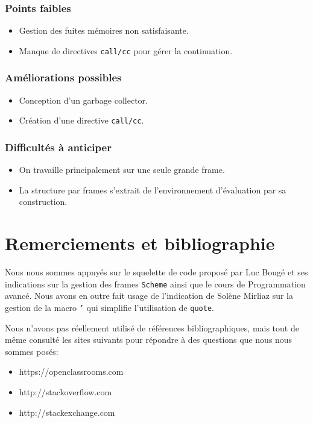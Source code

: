 \documentclass[a4paper,11pt]{article}
\begin{document}
\subsubsection*{Points faibles}
\begin{itemize}
\item Gestion des fuites mémoires non satisfaisante.
\item Manque de directives \texttt{call/cc} pour gérer la continuation.
\end{itemize}

\subsubsection*{Améliorations possibles}
\begin{itemize}
\item Conception d'un garbage collector.
\item Création d'une directive \texttt{call/cc}.
\end{itemize}

\subsubsection*{Difficultés à anticiper}
\begin{itemize}
\item On travaille principalement sur une seule grande frame.
\item La structure par frames s'extrait de l'environnement d'évaluation par sa construction.
\end{itemize}

\section{Remerciements et bibliographie}

Nous nous sommes appuyés sur le squelette de code proposé par Luc Bougé et ses
indications sur la gestion des frames \texttt{Scheme} ainsi que le cours de
Programmation avancé. Nous avons en outre fait
usage de l'indication de Solène Mirliaz sur la gestion de la macro \texttt{'} qui simplifie
l'utilisation de
\texttt{quote}.

Nous n'avons pas réellement utilisé de références bibliographiques, mais tout de
même consulté les sites suivants pour répondre à des questions que nous nous
sommes posés:
\begin{itemize}
\item https://openclassrooms.com
\item http://stackoverflow.com
\item http://stackexchange.com
\end{itemize}
\end{document}
